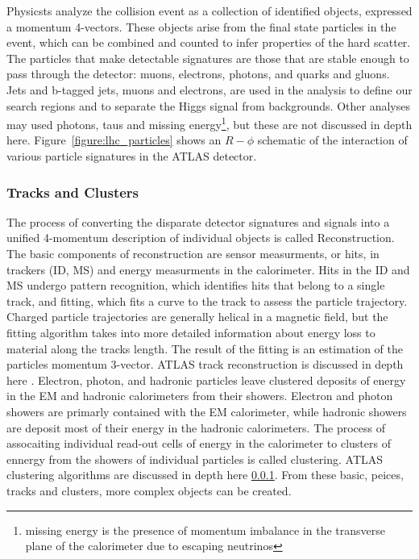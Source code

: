 Physicsts analyze the collision event as a collection of identified objects, expressed a momentum 4-vectors. These objects arise from the final state particles in the event, which can be combined and counted to infer properties of the hard scatter. The particles that make detectable signatures are those that are stable enough to pass through the detector: muons, electrons, photons, and quarks and gluons. Jets and b-tagged jets, muons and electrons, are used in the \tth analysis to define our search regions and to separate the Higgs signal from backgrounds. Other analyses may used photons, taus and missing energy\footnote{missing energy is the presence of momentum imbalance in the transverse plane of the calorimeter due to escaping neutrinos}, but these are not discussed in depth here. Figure~\ref{figure:lhc_particles} shows an $R-\phi$ schematic of the interaction of various particle signatures in the ATLAS detector.  


 

\subsubsection{Tracks and Clusters}

The process of converting the disparate detector signatures and signals into a unified 4-momentum description of individual objects is called Reconstruction. The basic components of reconstruction are sensor measurments, or hits, in trackers (ID, MS) and energy measurments in the calorimeter. Hits in the ID and MS undergo pattern recognition, which identifies hits that belong to a single track, and fitting, which fits a curve to the track to assess the particle trajectory. Charged particle trajectories are generally helical in a magnetic field, but the fitting algorithm takes into more detailed information about energy loss to material along the tracks length. The result of the fitting is an estimation of the particles momentum 3-vector. ATLAS track reconstruction is discussed in depth here \cite{}. Electron, photon, and hadronic particles leave clustered deposits of energy in the EM and hadronic calorimeters from their showers. Electron and photon showers are primarly contained with the EM calorimeter, while hadronic showers are deposit most of their energy in the hadronic calorimeters. The process of assocaiting individual read-out cells of energy in the calorimeter to clusters of ennergy from the showers of individual particles is called clustering. ATLAS clustering algorithms are discussed in depth here \ref{}. From these basic, peices, tracks and clusters, more complex objects can be created. 

